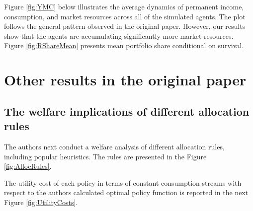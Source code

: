\documentclass[./CGMPort.tex]{subfiles}
\begin{document}
Figure \ref{fig:YMC} below illustrates the average dynamics of permanent income, consumption, and market resources across all of the simulated agents. The plot follows the general pattern observed in the original paper. However, our results show that the agents are accumulating significantly more market resources. Figure \ref{fig:RShareMean} presents mean portfolio share conditional on survival.

\providecommand{\figName}{Variable-Means-Conditional-on-Survival} %
\providecommand{\figFile}{YMC_Means} %
\hypertarget{\figFile}{}
\hypertarget{\figName}{}

\providecommand{\figName}{RShare-Means-Conditional-on-Survival} %
\providecommand{\figFile}{RShare_Means} %
\hypertarget{\figFile}{}
\hypertarget{\figName}{}

\section{Other results in the original paper}

\subsection{The welfare implications of different allocation rules}

The authors next conduct a welfare analysis of different allocation rules, including popular heuristics. The rules are presented in the Figure \ref{fig:AllocRules}.

\providecommand{\figName}{Allocation-Rules} %
\providecommand{\figFile}{Alloc_rules} %
\hypertarget{\figFile}{}
\hypertarget{\figName}{}

The utility cost of each policy in terms of constant consumption streams with respect to the authors calculated optimal policy function is reported in the next Figure \ref{fig:UtilityCosts}.

\providecommand{\figName}{Utility-Costs} %
\providecommand{\figFile}{Util_cost} %
\hypertarget{\figFile}{}
\hypertarget{\figName}{}
\end{document}
